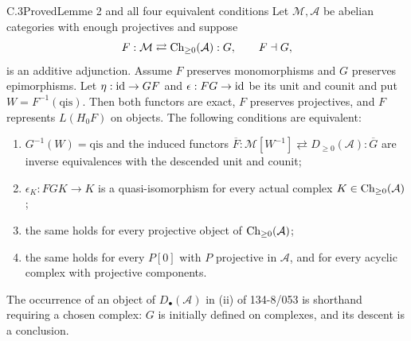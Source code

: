 \begin{claim}{C.3}{Proved}{Lemme 2 and all four equivalent conditions}\label{C3}
Let $\mathcal M,\mathcal A$ be abelian categories with enough projectives and suppose
\[
 F:\mathcal M\rightleftarrows\operatorname{Ch}_{\geq0}(\mathcal A):G,
 \qquad F\dashv G,
\]
is an additive adjunction. Assume $F$ preserves monomorphisms and $G$ preserves epimorphisms. Let $\eta:\operatorname{id}\to GF$ and $\epsilon:FG\to\operatorname{id}$ be its unit and counit and put $W=F^{-1}(\mathrm{qis})$. Then both functors are exact, $F$ preserves projectives, and $F$ represents $L(H_0F)$ on objects. The following conditions are equivalent:
\begin{enumerate}
\item[(i)] $G^{-1}(W)=\mathrm{qis}$ and the induced functors $\overline F:\mathcal M[W^{-1}]\rightleftarrows D_{\geq0}(\mathcal A):\overline G$ are inverse equivalences with the descended unit and counit;
\item[(ii)] $\epsilon_K:FGK\to K$ is a quasi-isomorphism for every actual complex $K\in\operatorname{Ch}_{\geq0}(\mathcal A)$;
\item[(ii$'$)] the same holds for every projective object of $\operatorname{Ch}_{\geq0}(\mathcal A)$;
\item[(ii$''$)] the same holds for every $P[0]$ with $P$ projective in $\mathcal A$, and for every acyclic complex with projective components.
\end{enumerate}
The occurrence of an object of $D_\bullet(\mathcal A)$ in (ii) of 134-8/053 is shorthand requiring a chosen complex: $G$ is initially defined on complexes, and its descent is a conclusion.
\end{claim}
